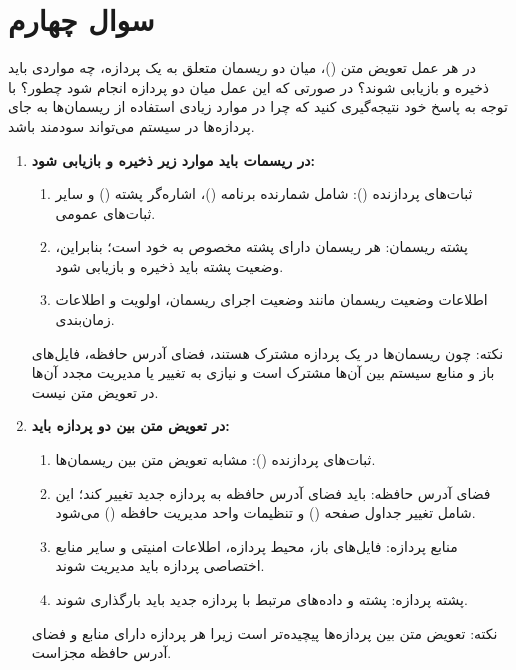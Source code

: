 \section{سوال چهارم}

در هر عمل تعویض متن ()، میان دو ریسمان متعلق به یک پردازه، چه مواردی باید ذخیره و بازیابی شوند؟ در صورتی که این عمل میان دو پردازه انجام شود چطور؟ با توجه به پاسخ خود نتیجه‌گیری کنید که چرا در موارد زیادی استفاده از ریسمان‌ها به جای پردازه‌ها در سیستم می‌تواند سودمند باشد.

\begin{qsolve}
	\begin{enumerate}
		\item 
		\textbf{در ریسمات باید موارد زیر ذخیره و بازیابی شود: }\\
		\begin{enumerate}
			\item 
			ثبات‌های پردازنده (): شامل شمارنده برنامه ()، اشاره‌گر پشته () و سایر ثبات‌های عمومی.
			
			\item 
			پشته ریسمان: هر ریسمان دارای پشته مخصوص به خود است؛ بنابراین، وضعیت پشته باید ذخیره و بازیابی شود.
			
			\item 
			اطلاعات وضعیت ریسمان مانند وضعیت اجرای ریسمان، اولویت و اطلاعات زمان‌بندی.
			
		\end{enumerate}
		نکته: چون ریسمان‌ها در یک پردازه مشترک هستند، فضای آدرس حافظه، فایل‌های باز و منابع سیستم بین آن‌ها مشترک است و نیازی به تغییر یا مدیریت مجدد آن‌ها در تعویض متن نیست.
		
		
		\item 
		\textbf{در تعویض متن بین دو پردازه باید: }\\
		\begin{enumerate}
			\item 
			ثبات‌های پردازنده (): مشابه تعویض متن بین ریسمان‌ها.
			
			\item 
			فضای آدرس حافظه: باید فضای آدرس حافظه به پردازه جدید تغییر کند؛ این شامل تغییر جداول صفحه () و تنظیمات واحد مدیریت حافظه () می‌شود.
			
			\item 
			منابع پردازه: فایل‌های باز، محیط پردازه، اطلاعات امنیتی و سایر منابع اختصاصی پردازه باید مدیریت شوند.
			
			\item 
			پشته پردازه: پشته و داده‌های مرتبط با پردازه جدید باید بارگذاری شوند.
		\end{enumerate}
	نکته: تعویض متن بین پردازه‌ها پیچیده‌تر است زیرا هر پردازه دارای منابع و فضای آدرس حافظه مجزاست.
	\end{enumerate}
	
\end{qsolve}
